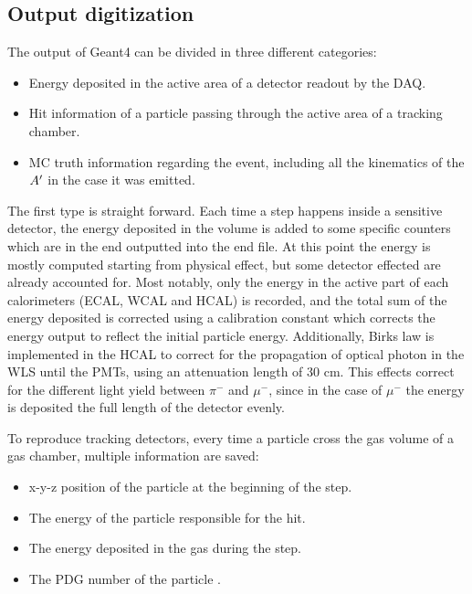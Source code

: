 \subsection{Output digitization}
\label{ch3:sec:geant4-digitization}

The output of Geant4 can be divided in three different categories:

\begin{itemize}
\item Energy deposited in the active area of a detector readout by the DAQ.
\item Hit information of a particle passing through the active area of a tracking chamber.
\item MC truth information regarding the event, including all the kinematics of the $A'$ in the case it was emitted.
\end{itemize}

The first type is straight forward. Each time a step happens inside a sensitive detector, the energy deposited in the volume is added to some specific counters which are in the end outputted into the end file. At this point the energy is mostly computed starting from physical effect, but some detector effected are already accounted for. Most notably, only the energy in the active part of each calorimeters (ECAL, WCAL and HCAL) is recorded, and the total sum of the energy deposited is corrected using a calibration constant which corrects the energy output to reflect the initial particle energy. Additionally, Birks law \cite{NYIBULE2014141} is implemented in the HCAL to correct for the propagation of optical photon in the WLS until the PMTs, using an attenuation length of 30 \si{\centi\meter}. This effects correct for the different light yield between $\pi^-$ and $\mu^-$, since in the case of $\mu^-$ the energy is deposited the full length of the detector evenly.

To reproduce tracking detectors, every time a particle cross the gas volume of a gas chamber, multiple information are saved:

\begin{itemize}
\item x-y-z position of the particle at the beginning of the step.
\item The energy of the particle responsible for the hit.  
\item The energy deposited in the gas during the step.
\item The PDG number of the particle \cite{particle-numbering-scheme}.
\end{itemize}

